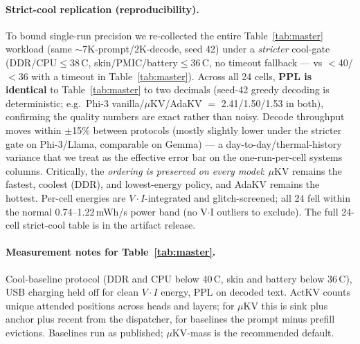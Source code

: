 \documentclass[sigconf, anonymous=false, screen=true]{acmart}
\begin{document}
\paragraph{Strict-cool replication (reproducibility).} To bound single-run precision we re-collected the entire Table~\ref{tab:master} workload (same $\sim$7K-prompt/2K-decode, seed 42) under a \emph{stricter} cool-gate (DDR/CPU$\le$38\,\textdegree C, skin/PMIC/battery$\le$36\,\textdegree C, no timeout fallback --- vs $<$40/$<$36 with a timeout in Table~\ref{tab:master}). Across all 24 cells, \textbf{PPL is identical} to Table~\ref{tab:master} to two decimals (seed-42 greedy decoding is deterministic; e.g.\ Phi-3 vanilla/$\mu$KV/AdaKV $=$ 2.41/1.50/1.53 in both), confirming the quality numbers are exact rather than noisy. Decode throughput moves within $\pm$15\% between protocols (mostly slightly lower under the stricter gate on Phi-3/Llama, comparable on Gemma) --- a day-to-day/thermal-history variance that we treat as the effective error bar on the one-run-per-cell systems columns. Critically, the \emph{ordering is preserved on every model}: $\mu$KV remains the fastest, coolest (DDR), and lowest-energy policy, and AdaKV remains the hottest. Per-cell energies are $V{\cdot}I$-integrated and glitch-screened; all 24 fell within the normal 0.74--1.22\,mWh/s power band (no V$\cdot$I outliers to exclude). The full 24-cell strict-cool table is in the artifact release.


\paragraph{Measurement notes for Table~\ref{tab:master}.} Cool-baseline protocol (DDR and CPU below 40\,\textdegree C, skin and battery below 36\,\textdegree C), USB charging held off for clean $V{\cdot}I$ energy, PPL on decoded text. ActKV counts unique attended positions across heads and layers; for $\mu$KV this is sink plus anchor plus recent from the dispatcher, for baselines the prompt minus prefill evictions. Baselines run as published; $\mu$KV-mass is the recommended default.
\end{document}
